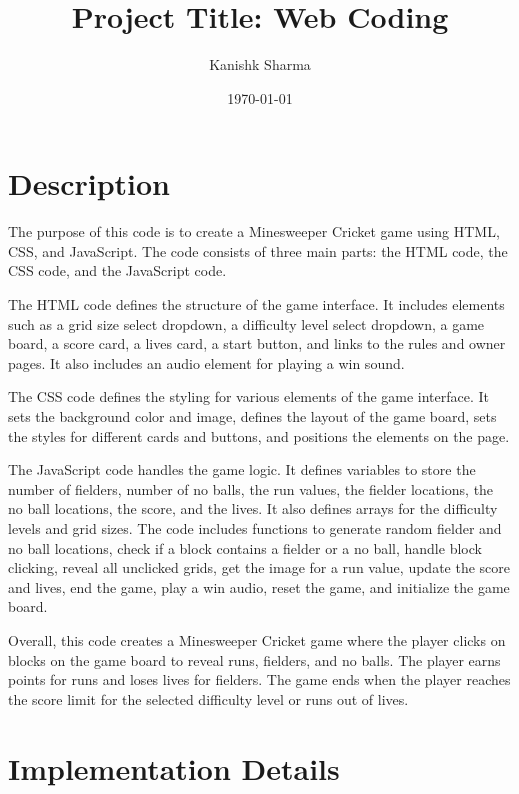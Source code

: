 \documentclass{article}
\begin{document}
\title{Project Title: Web Coding}
\author{Kanishk Sharma}
\date{\today}

\maketitle

\section*{Description}
The purpose of this code is to create a Minesweeper Cricket game using HTML, CSS, and JavaScript. The code consists of three main parts: the HTML code, the CSS code, and the JavaScript code.

The HTML code defines the structure of the game interface. It includes elements such as a grid size select dropdown, a difficulty level select dropdown, a game board, a score card, a lives card, a start button, and links to the rules and owner pages. It also includes an audio element for playing a win sound.

The CSS code defines the styling for various elements of the game interface. It sets the background color and image, defines the layout of the game board, sets the styles for different cards and buttons, and positions the elements on the page.

The JavaScript code handles the game logic. It defines variables to store the number of fielders, number of no balls, the run values, the fielder locations, the no ball locations, the score, and the lives. It also defines arrays for the difficulty levels and grid sizes. The code includes functions to generate random fielder and no ball locations, check if a block contains a fielder or a no ball, handle block clicking, reveal all unclicked grids, get the image for a run value, update the score and lives, end the game, play a win audio, reset the game, and initialize the game board.

Overall, this code creates a Minesweeper Cricket game where the player clicks on blocks on the game board to reveal runs, fielders, and no balls. The player earns points for runs and loses lives for fielders. The game ends when the player reaches the score limit for the selected difficulty level or runs out of lives.

\cite{geeksforgeeks}
\cite{opengenus}

\section*{Implementation Details}
\end{document}
